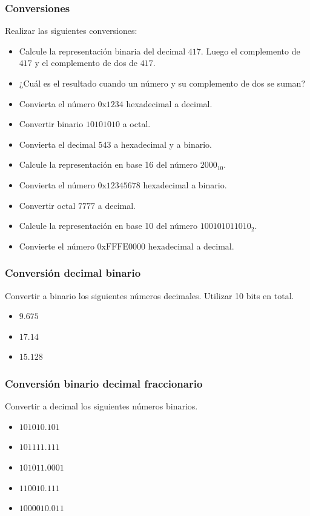 \subsubsection{Conversiones}
Realizar las siguientes conversiones:
\begin{itemize}
  \item Calcule la representación binaria del decimal $\mathrm{417}$. Luego el complemento de $\mathrm{417}$ y el complemento de dos de $\mathrm{417}$.
  \item ¿Cuál es el resultado cuando un número y su complemento de dos se suman?
  \item Convierta el número $\mathrm{0x1234}$ hexadecimal a decimal.
  \item Convertir binario $\mathrm{10101010}$ a octal.
  \item Convierta el decimal $\mathrm{543}$ a hexadecimal y a binario.
  \item Calcule la representación en base 16 del número $\mathrm{2000}_{10}$.
  \item Convierta el número $\mathrm{0x12345678}$ hexadecimal a binario.
  \item Convertir octal $\mathrm{7777}$ a decimal.
  \item Calcule la representación en base 10 del número $\mathrm{100101011010}_{2}$.
  \item Convierte el número $\mathrm{0xFFFE0000}$ hexadecimal a decimal.
\end{itemize}

\subsubsection{Conversión decimal binario}
Convertir a binario los siguientes números decimales. Utilizar 10 bits en total.
\begin{itemize}
  \item $9.675$
  \item $17.14$
  \item $15.128$
\end{itemize}

\subsubsection{Conversión binario decimal fraccionario}
Convertir a decimal los siguientes números binarios.
\begin{itemize}
    \item $\mathrm{101010.101}$
    \item $\mathrm{101111.111}$
    \item $\mathrm{101011.0001}$
    \item $\mathrm{110010.111}$
    \item $\mathrm{1000010.011}$
\end{itemize}

